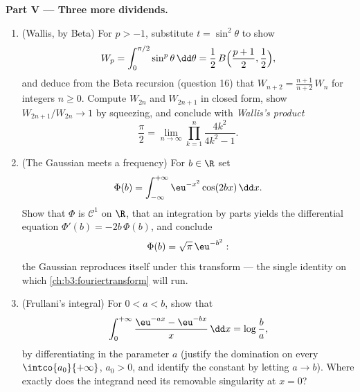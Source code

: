 \begin{problem}
\medskip
\noindent\textbf{Part V --- Three more dividends.}
\begin{enumerate}[resume]
  \item (Wallis, by Beta) For $p > -1$, substitute $t =
        \sin^2\theta$ to show
        \[
        W_p = \int_0^{\pi/2}\sin^p\theta\,\dd\theta
        = \frac12\,B\Bigl(\frac{p+1}2, \frac12\Bigr),
        \]
        and deduce from the Beta recursion (question 16) that
        $W_{n+2} = \frac{n+1}{n+2}\,W_n$ for integers $n \geq
        0$. Compute $W_{2n}$ and $W_{2n+1}$ in closed form,
        show $W_{2n+1}/W_{2n} \to 1$ by squeezing, and conclude
        with \emph{Wallis's product}
        \[
        \frac\pi2 = \lim_{n\to\infty}
        \prod_{k=1}^{n}\frac{4k^2}{4k^2 - 1} .
        \]
  \item (The Gaussian meets a frequency) For $b \in \R$ set
        \[
        \Phi(b) = \int_{-\infty}^{+\infty}
        \eu^{-x^2}\cos(2bx)\,\dd x .
        \]
        Show that $\Phi$ is $\mathcal C^1$ on $\R$, that an
        integration by parts yields the differential equation
        $\Phi'(b) = -2b\,\Phi(b)$, and conclude
        \[
        \Phi(b) = \sqrt\pi\,\eu^{-b^2} :
        \]
        the Gaussian reproduces itself under this transform ---
        the single identity on which
        \cref{ch:b3:fouriertransform} will run.
  \item (Frullani's integral) For $0 < a < b$, show that
        \[
        \int_0^{+\infty}
        \frac{\eu^{-ax} - \eu^{-bx}}{x}\,\dd x
        = \log\frac ba ,
        \]
        by differentiating in the parameter $a$ (justify the
        domination on every $\intco{a_0}{+\infty}$, $a_0 > 0$,
        and identify the constant by letting $a \to b$).
        Where exactly does the integrand need its removable
        singularity at $x = 0$?
\end{enumerate}
\end{problem}
